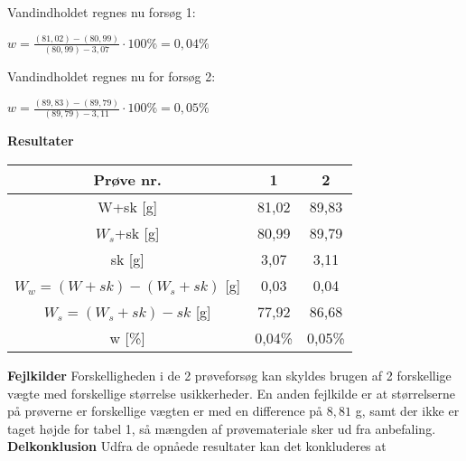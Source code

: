 Vandindholdet regnes nu forsøg 1:
\begin{center}
	$w=\frac{(81,\!02)-(80,\!99)}{(80,\!99)-3,\!07}\cdot100\%=0,\!04\%$
\end{center}

Vandindholdet regnes nu for forsøg 2:
\begin{center}
	$w=\frac{(89,\!83)-(89,\!79)}{(89,\!79)-3,\!11}\cdot100\%=0,\!05\%$
\end{center}

\textbf{Resultater}
\begin{center}
	\begin{tabular}{ |c|c|c| } 
		\hline
		Prøve nr. & 1 & 2 \\	\hline
		W+sk [g] & 81,02 & 89,83 \\	\hline
		$W_s$+sk [g] & 80,99 & 89,79 \\	\hline 
		sk [g] & 3,07 & 3,11 \\ \hline
		$W_w=(W+sk) - (W_s+sk)$ [g] & 0,03 & 0,04 \\	\hline
		$W_s=(W_s+sk) - sk$ [g] & 77,92 & 86,68 \\	\hline		
		w [\%] & 0,04\% & 0,05\% \\	\hline	
	\end{tabular}
\end{center}

\textbf{Fejlkilder}
\newline
Forskelligheden i de 2 prøveforsøg kan skyldes brugen af 2 forskellige vægte med forskellige størrelse usikkerheder. En anden fejlkilde er at størrelserne på prøverne er forskellige vægten er med en difference på $8,\!81$ g, samt der ikke er taget højde for tabel 1, så mængden af prøvemateriale sker ud fra anbefaling.
\newline
\newline
\textbf{Delkonklusion}
\newline
Udfra de opnåede resultater kan det konkluderes at 